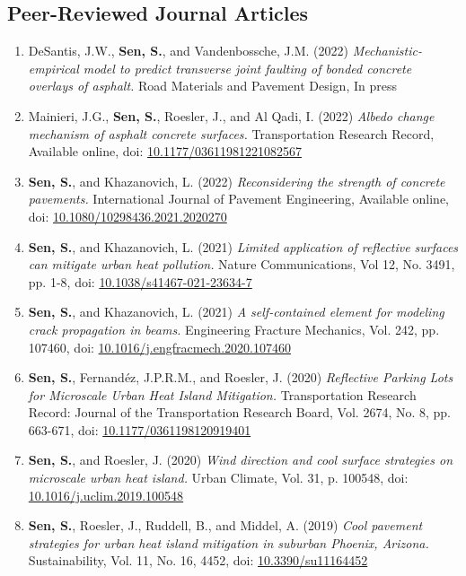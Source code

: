 \documentclass[12pt]{article}
\begin{document}
\subsection*{Peer-Reviewed Journal Articles}
\begin{enumerate}[label=(J\arabic*)]
	\item DeSantis, J.W., \textbf{Sen, S.}, and Vandenbossche, J.M. (2022) \textit{Mechanistic-empirical model to predict transverse joint faulting of bonded concrete overlays of asphalt.} Road Materials and Pavement Design, In press
	\item Mainieri, J.G., \textbf{Sen, S.}, Roesler, J., and Al Qadi, I. (2022) \textit{Albedo change mechanism of asphalt concrete surfaces.} Transportation Research Record, Available online, doi: \href{https://doi.org/10.1177/036119812210825670}{10.1177/03611981221082567}
	\item \textbf{Sen, S.}, and Khazanovich, L. (2022) \textit{Reconsidering the strength of concrete pavements.} International Journal of Pavement Engineering, Available online, doi: \href{https://doi.org/10.1080/10298436.2021.2020270}{10.1080/10298436.2021.2020270}
	\item \textbf{Sen, S.}, and Khazanovich, L. (2021) \textit{Limited application of reflective surfaces can mitigate urban heat pollution.} Nature Communications, Vol 12, No. 3491, pp. 1-8, doi: \href{https://doi.org/10.1038/s41467-021-23634-7}{10.1038/s41467-021-23634-7}
	\item \textbf{Sen, S.}, and Khazanovich, L. (2021) \textit{A self-contained element for modeling crack propagation in beams.} Engineering Fracture Mechanics, Vol. 242, pp. 107460, doi: \href{https://doi.org/10.1016/j.engfracmech.2020.107460}{10.1016/j.engfracmech.2020.107460}			
	\item \textbf{Sen, S.}, Fernand\'ez, J.P.R.M., and Roesler, J. (2020) \textit{Reflective Parking Lots for Microscale Urban Heat Island Mitigation.}  Transportation Research Record: Journal of the Transportation Research Board, Vol. 2674, No. 8, pp. 663-671, doi: \href{https://doi.org/10.1177/0361198120919401}{10.1177/0361198120919401}	
		\item \textbf{Sen, S.}, and Roesler, J. (2020) \textit{Wind direction and cool surface strategies on microscale urban heat island.}  Urban Climate, Vol. 31, p. 100548, doi: \href{https://doi.org/10.1016/j.uclim.2019.100548}{10.1016/j.uclim.2019.100548}
	\item \textbf{Sen, S.}, Roesler, J., Ruddell, B., and Middel, A. (2019) \textit{Cool pavement strategies for urban heat island mitigation in suburban Phoenix, Arizona.}  Sustainability, Vol. 11, No. 16, 4452, doi: \href{https://doi.org/10.3390/su11164452}{10.3390/su11164452}

\end{enumerate}
\end{document}
